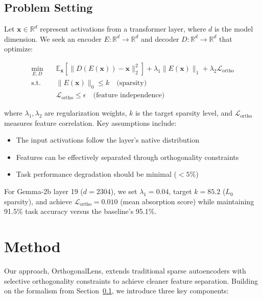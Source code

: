 \documentclass{article} %
\begin{document}
\subsection{Problem Setting}
\label{subsec:problem}

Let $\mathbf{x} \in \mathbb{R}^d$ represent activations from a transformer layer, where $d$ is the model dimension. We seek an encoder $E: \mathbb{R}^d \rightarrow \mathbb{R}^d$ and decoder $D: \mathbb{R}^d \rightarrow \mathbb{R}^d$ that optimize:

\begin{align*}
\min_{E,D} \quad & \mathbb{E}_{\mathbf{x}}[\|D(E(\mathbf{x})) - \mathbf{x}\|_2^2] + \lambda_1\|E(\mathbf{x})\|_1 + \lambda_2\mathcal{L}_{\text{ortho}} \\
\text{s.t.} \quad & \|E(\mathbf{x})\|_0 \leq k \quad \text{(sparsity)} \\
& \mathcal{L}_{\text{ortho}} \leq \epsilon \quad \text{(feature independence)}
\end{align*}

where $\lambda_1, \lambda_2$ are regularization weights, $k$ is the target sparsity level, and $\mathcal{L}_{\text{ortho}}$ measures feature correlation. Key assumptions include:

\begin{itemize}
    \item The input activations follow the layer's native distribution
    \item Features can be effectively separated through orthogonality constraints
    \item Task performance degradation should be minimal ($<5\%$)
\end{itemize}

For Gemma-2b layer 19 ($d=2304$), we set $\lambda_1=0.04$, target $k=85.2$ ($L_0$ sparsity), and achieve $\mathcal{L}_{\text{ortho}}=0.010$ (mean absorption score) while maintaining 91.5\% task accuracy versus the baseline's 95.1\%.

\section{Method}
\label{sec:method}

Our approach, OrthogonalLens, extends traditional sparse autoencoders with selective orthogonality constraints to achieve cleaner feature separation. Building on the formalism from Section~\ref{subsec:problem}, we introduce three key components:
\end{document}
